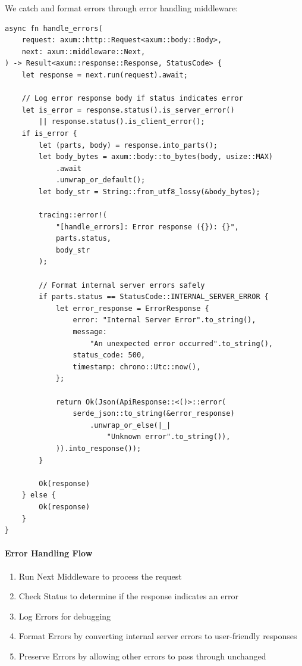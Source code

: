 We catch and format errors through error handling middleware:

\begin{listing}[htbp]
\caption{Error handling middleware}
\label{lst:middleware-error-handling}
\begin{verbatim}
async fn handle_errors(
    request: axum::http::Request<axum::body::Body>,
    next: axum::middleware::Next,
) -> Result<axum::response::Response, StatusCode> {
    let response = next.run(request).await;

    // Log error response body if status indicates error
    let is_error = response.status().is_server_error()
        || response.status().is_client_error();
    if is_error {
        let (parts, body) = response.into_parts();
        let body_bytes = axum::body::to_bytes(body, usize::MAX)
            .await
            .unwrap_or_default();
        let body_str = String::from_utf8_lossy(&body_bytes);

        tracing::error!(
            "[handle_errors]: Error response ({}): {}",
            parts.status,
            body_str
        );

        // Format internal server errors safely
        if parts.status == StatusCode::INTERNAL_SERVER_ERROR {
            let error_response = ErrorResponse {
                error: "Internal Server Error".to_string(),
                message:
                    "An unexpected error occurred".to_string(),
                status_code: 500,
                timestamp: chrono::Utc::now(),
            };

            return Ok(Json(ApiResponse::<()>::error(
                serde_json::to_string(&error_response)
                    .unwrap_or_else(|_|
                        "Unknown error".to_string()),
            )).into_response());
        }

        Ok(response)
    } else {
        Ok(response)
    }
}
\end{verbatim}
\end{listing}

\paragraph{Error Handling Flow}

\begin{enumerate}
  \item Run Next Middleware to process the request
  \item Check Status to determine if the response indicates an error
  \item Log Errors for debugging
  \item Format Errors by converting internal server errors to user-friendly responses
  \item Preserve Errors by allowing other errors to pass through unchanged
\end{enumerate}

